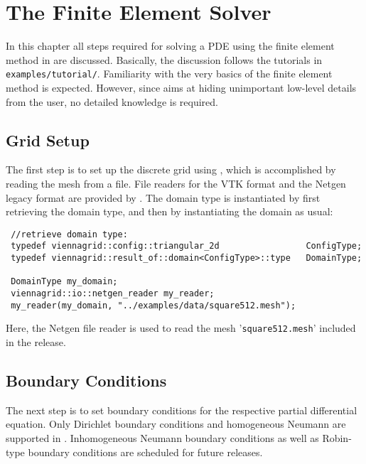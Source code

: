 
\chapter{The Finite Element Solver}  \label{chap:fem}

In this chapter all steps required for solving a PDE using the finite element method in {\ViennaFEM} are discussed.
Basically, the discussion follows the tutorials in \lstinline|examples/tutorial/|. 
Familiarity with the very basics of the finite element method is expected. However, since {\ViennaFEM} aims at hiding unimportant low-level details from the
user, no detailed knowledge is required.

\section{Grid Setup}
The first step is to set up the discrete grid using {\ViennaGrid},
which is accomplished by reading the mesh from a file. 
File readers for the VTK format \cite{VTK,VTKfileformat} and the Netgen legacy format \cite{netgen} are provided by {\ViennaGrid}.
The domain type is instantiated by first retrieving the domain type, and then by instantiating the domain as usual:
\begin{lstlisting}
 //retrieve domain type:
 typedef viennagrid::config::triangular_2d                 ConfigType;
 typedef viennagrid::result_of::domain<ConfigType>::type   DomainType;

 DomainType my_domain;
 viennagrid::io::netgen_reader my_reader;
 my_reader(my_domain, "../examples/data/square512.mesh");
\end{lstlisting}
Here, the Netgen file reader is used to read the mesh '\texttt{square512.mesh}' included in the {\ViennaFEM} release.



\section{Boundary Conditions}
The next step is to set boundary conditions for the respective partial differential equation.
Only Dirichlet boundary conditions and homogeneous Neumann are supported in {\ViennaFEMversion}.
Inhomogeneous Neumann boundary conditions as well as Robin-type boundary conditions are scheduled for future releases.


